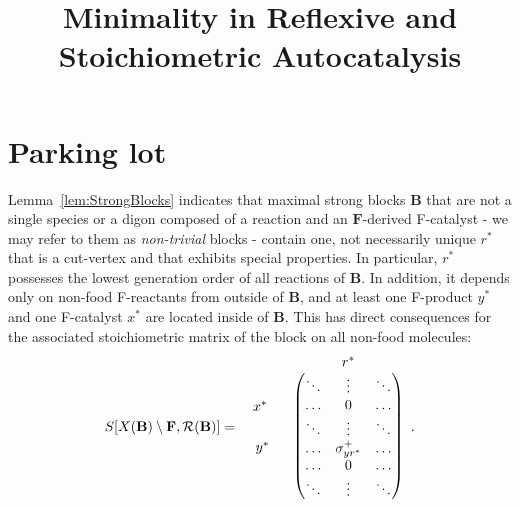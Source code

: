 \documentclass[pdflatex]{sn-jnl}
\theoremstyle{thmstyleone}%
\theoremstyle{examplesty}%
\theoremstyle{thmstylethree}%
\newcommand{\food}{\ensuremath{\mathbf{F}}}
\newcommand{\SM}{S}
\newcommand{\CR}[0]{\mathcal{R}}
\newcommand{\block}[0]{\mathbf{B}}
\newcommand{\holy}[1]{\begingroup\color{royalpurple}#1\endgroup}
\begin{document}
\title{Minimality in Reflexive and Stoichiometric Autocatalysis} 




\section{Parking lot}


\holy{
Lemma~\ref{lem:StrongBlocks} indicates that maximal strong blocks $\block$ 
that are not a single species or a digon composed of a reaction and an $\food$-derived F-catalyst - we may refer to them as \emph{non-trivial} blocks - contain one, not necessarily unique $r^*$ that is a cut-vertex and that exhibits special properties. In particular, $r^*$ possesses the lowest generation order of all reactions of $\block$. In addition, it depends only on non-food F-reactants from outside of $\block$, and at least one F-product $y^*$ and one F-catalyst $x^*$ are located inside of $\block$. This has direct consequences for the associated stoichiometric matrix of the block on all non-food molecules:
\begin{equation}
  \SM[X(\block)\setminus \food,\CR(\block)] = 
  \begin{array}{c c}
    & 	\begin{array}{c c c} 			
	  & 	r^* 		& 
	\end{array} \\
    \begin{array}{c} 
      \ \\ 
      x^* \ \\
      \ \\ [0.5em]
      y^* \\
      \ \\
      \ \\		
    \end{array}
    & \begin{pmatrix}						
	\ddots 	& 	\vdots 			& \ddots \\
	\ldots 	& 	0 				& \ldots \\
	\ddots 	& 	\vdots 			& \ddots \\
	\ldots 	& 	\sigma^+_{yr^*} 	& \ldots \\
	\ldots 	& 	0 				& \ldots \\
	\ddots 	& 	\vdots 			& \ddots 
      \end{pmatrix}
  \end{array}.
\end{equation}
\vspace{6pt}

}
\end{document}
